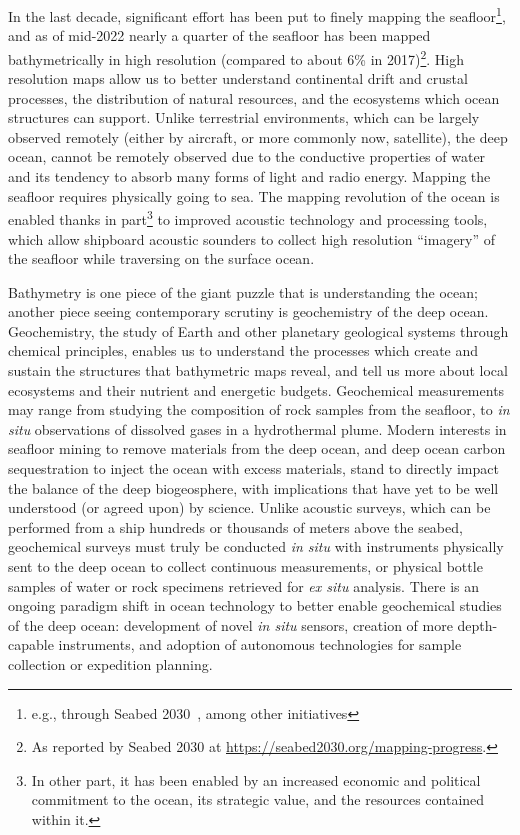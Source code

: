 In the last decade, significant effort has been put to finely mapping the seafloor\footnote{e.g., through Seabed 2030~\autocite{mayer2018nippon}, among other initiatives}, and as of mid-2022 nearly a quarter of the seafloor has been mapped bathymetrically in high resolution (compared to about 6\% in 2017)\footnote{As reported by Seabed 2030 at \url{https://seabed2030.org/mapping-progress}.}. 
High resolution maps allow us to better understand continental drift and crustal processes, the distribution of natural resources, and the ecosystems which ocean structures can support.
Unlike terrestrial environments, which can be largely observed remotely (either by aircraft, or more commonly now, satellite), the deep ocean, cannot be remotely observed due to the conductive properties of water and its tendency to absorb many forms of light and radio energy.
Mapping the seafloor requires physically going to sea.
The mapping revolution of the ocean is enabled thanks in part\footnote{In other part, it has been enabled by an increased economic and political commitment to the ocean, its strategic value, and the resources contained within it.} to improved acoustic technology and processing tools, which allow shipboard acoustic sounders to collect high resolution ``imagery'' of the seafloor while traversing on the surface ocean.

Bathymetry is one piece of the giant puzzle that is understanding the ocean; another piece seeing contemporary scrutiny is geochemistry of the deep ocean.
Geochemistry, the study of Earth and other planetary geological systems through chemical principles, enables us to understand the processes which create and sustain the structures that bathymetric maps reveal, and tell us more about local ecosystems and their nutrient and energetic budgets. 
Geochemical measurements may range from studying the composition of rock samples from the seafloor, to \emph{in situ} observations of dissolved gases in a hydrothermal plume.
Modern interests in seafloor mining to remove materials from the deep ocean\autocite{thompson2018seabed}, and deep ocean carbon sequestration to inject the ocean with excess materials\autocite{teng2018long}, stand to directly impact the balance of the deep biogeosphere, with implications that have yet to be well understood (or agreed upon) by science\autocite{smith2020deep,seibel2001potential,fleeger2010response,sharma2015environmental,childs2020extraction,van2011tighten}.
Unlike acoustic surveys, which can be performed from a ship hundreds or thousands of meters above the seabed, geochemical surveys must truly be conducted \emph{in situ} with instruments physically sent to the deep ocean to collect continuous measurements, or physical bottle samples of water or rock specimens retrieved for \emph{ex situ} analysis.
There is an ongoing paradigm shift in ocean technology to better enable geochemical studies of the deep ocean: development of novel \emph{in situ} sensors, creation of more depth-capable instruments, and adoption of autonomous technologies for sample collection or expedition planning. 

